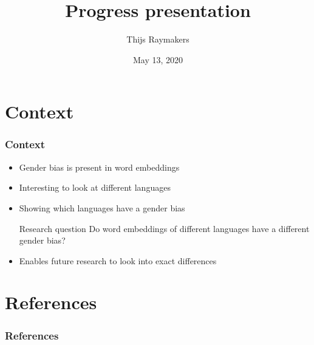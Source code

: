 \documentclass[handout]{beamer}
\author{Thijs Raymakers}
\title{Progress presentation}
\date{May 13, 2020}
\begin{document}
\begin{frame}
    \titlepage
\end{frame}

\section{Context}
\begin{frame}
\frametitle{Context}
\begin{itemize}
    \item Gender bias is present in word embeddings~
    \pause
    \item Interesting to look at different languages
    \pause
    \item Showing which languages have a gender bias
    \pause
    \begin{block}{Research question}
        Do word embeddings of different languages have a different gender bias?
    \end{block}
    \pause
    \item Enables future research to look into exact differences
\end{itemize}
\end{frame}


\section{References}
\begin{frame}
\frametitle{References}
\printbibliography[heading=none]
\end{frame}
\end{document}
